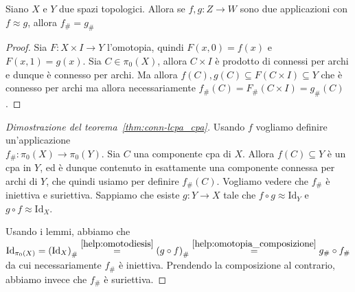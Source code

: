     \begin{lemma}\label{help:omotodiesis}
        Siano \(X\) e \(Y\) due spazi topologici. Allora se \(f, g : Z \to W\)
        sono due applicazioni con \(f \approx g\), allora \(f_\# = g_\#\)
    \end{lemma}
    \begin{proof}
        Sia \(F: X \times I \to Y\) l'omotopia, quindi \(F{(x, 0)} = f{(x)}\) e
    \(F{(x, 1)} = g{(x)}\). Sia \(C \in \pi_{0}{(X)}\), allora \(C \times I\) è
    prodotto di connessi per archi e dunque è connesso per archi. Ma allora
    \(f{(C)}, g{(C)}  \subseteq F{(C \times I)} \subseteq Y  \) che è connesso per archi
    ma allora necessariamente \(f_\# {(C)} = F_\#{(C \times I)} =g_\#{(C)}\).
    \end{proof}
\begin{proof}[Dimostrazione del teorema~\ref{thm:conn-lcpa_cpa}]
    Usando \(f\) vogliamo definire un'applicazione \\\(f_\# : \pi_{0}{(X)} \to 
    \pi_{0}{(Y)}\). Sia \(C\) una componente cpa di \(X\). Allora \(f{(C)}
    \subseteq Y \) è un cpa in \(Y\), ed è dunque contenuto in esattamente una 
    componente connessa per archi di \(Y\), che quindi usiamo per definire
    \(f_\# {(C)}\). Vogliamo vedere che \(f_\#\) è iniettiva e suriettiva.
    Sappiamo che esiste \(g : Y \to X\) tale che \(f \circ g \approx
    \mathrm{Id}_Y\) e \(g \circ f \approx \mathrm{Id}_X\).


    Usando i lemmi, abbiamo che \( \mathrm{Id}_{\pi_{0}{(X)}} =
    {(\mathrm{Id}_X)}_\# \overset{\ref{help:omotodiesis}}{=} {(g \circ f)}_\#
    \overset{\ref{help:omotopia_composizione}}{=} g_\# \circ f_\#\) da cui
    necessariamente \(f_\#\) è iniettiva. Prendendo la composizione al
    contrario, abbiamo invece che \(f_\#\) è suriettiva.
\end{proof}




